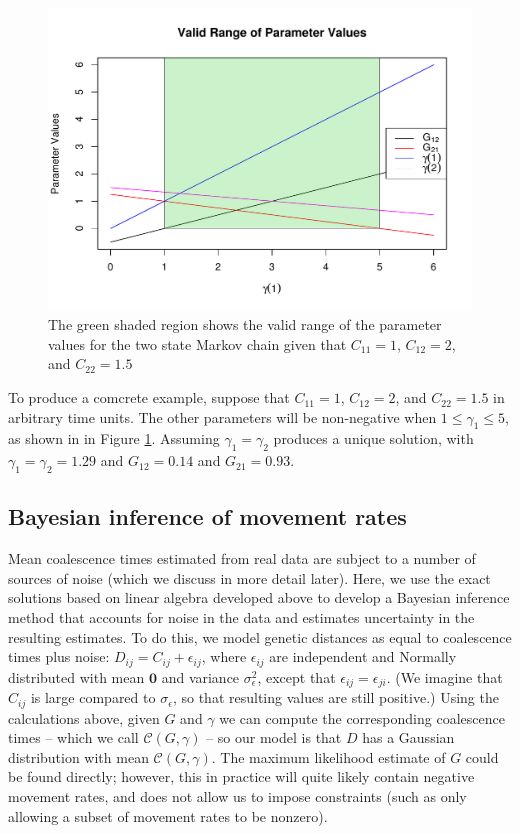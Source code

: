 \documentclass{article}
\begin{document}
\begin{figure}
\centering
         \includegraphics[scale=.7]{figs/valid_range}
    \caption{The green shaded region shows 
        the valid range of the parameter values
        for the two state Markov chain given that
        $C_{11}=1$, $C_{12}=2$, and $C_{22}=1.5$}
    \label{fig:valid_range}
\end{figure}

To produce a comcrete example, suppose that
$C_{11} = 1$, $C_{12} = 2$, and $C_{22} = 1.5$ in arbitrary time units.
The other parameters will be non-negative 
when $1 \leq \gamma_1 \leq 5$,
as shown in in Figure \ref{fig:valid_range}.
Assuming $\gamma_1 = \gamma_2$ produces a unique solution, 
with $\gamma_1 = \gamma_2 = 1.29$ and $G_{12} = 0.14$ and $G_{21} = 0.93$.


\subsection*{Bayesian inference of movement rates}

Mean coalescence times estimated from real data are subject to a number of sources of noise
(which we discuss in more detail later).
Here, we use
the exact solutions based on linear algebra developed above
to develop a Bayesian inference method that accounts for noise in the data
and estimates uncertainty in the resulting estimates.
To do this, we model genetic distances as equal to coalescence times plus noise:
$D_{ij} = C_{ij} + \epsilon_{ij}$,
where $\epsilon_{ij}$ are independent and Normally distributed
with mean $\mathbf{0}$ and variance $\sigma_\epsilon^2$,
except that $\epsilon_{ij} = \epsilon_{ji}$.
(We imagine that $C_{ij}$ is large compared to $\sigma_{\epsilon}$,
so that resulting values are still positive.)
Using the calculations above, 
given $G$ and $\gamma$ we can compute the corresponding coalescence times
-- which we call $\mathcal{C}(G, \gamma)$ --
so our model is that $D$ has a Gaussian distribution 
with mean $\mathcal{C}(G, \gamma)$.
The maximum likelihood estimate of $G$ could be found directly;
however, this in practice will quite likely contain negative movement rates,
and does not allow us to impose constraints
(such as only allowing a subset of movement rates to be nonzero).
\end{document}
